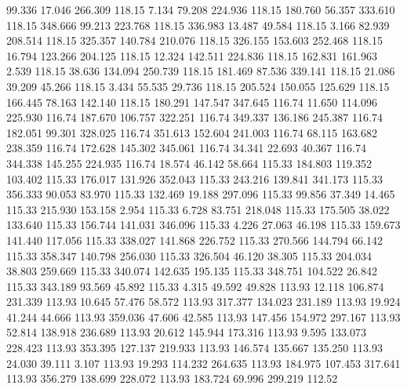   99.336   17.046  266.309       118.15
   7.134   79.208  224.936       118.15
 180.760   56.357  333.610       118.15
 348.666   99.213  223.768       118.15
 336.983   13.487   49.584       118.15
   3.166   82.939  208.514       118.15
 325.357  140.784  210.076       118.15
 326.155  153.603  252.468       118.15
  16.794  123.266  204.125       118.15
  12.324  142.511  224.836       118.15
 162.831  161.963    2.539       118.15
  38.636  134.094  250.739       118.15
 181.469   87.536  339.141       118.15
  21.086   39.209   45.266       118.15
   3.434   55.535   29.736       118.15
 205.524  150.055  125.629       118.15
 166.445   78.163  142.140       118.15
 180.291  147.547  347.645       116.74
  11.650  114.096  225.930       116.74
 187.670  106.757  322.251       116.74
 349.337  136.186  245.387       116.74
 182.051   99.301  328.025       116.74
 351.613  152.604  241.003       116.74
  68.115  163.682  238.359       116.74
 172.628  145.302  345.061       116.74
  34.341   22.693   40.367       116.74
 344.338  145.255  224.935       116.74
  18.574   46.142   58.664       115.33
 184.803  119.352  103.402       115.33
 176.017  131.926  352.043       115.33
 243.216  139.841  341.173       115.33
 356.333   90.053   83.970       115.33
 132.469   19.188  297.096       115.33
  99.856   37.349   14.465       115.33
 215.930  153.158    2.954       115.33
   6.728   83.751  218.048       115.33
 175.505   38.022  133.640       115.33
 156.744  141.031  346.096       115.33
   4.226   27.063   46.198       115.33
 159.673  141.440  117.056       115.33
 338.027  141.868  226.752       115.33
 270.566  144.794   66.142       115.33
 358.347  140.798  256.030       115.33
 326.504   46.120   38.305       115.33
 204.034   38.803  259.669       115.33
 340.074  142.635  195.135       115.33
 348.751  104.522   26.842       115.33
 343.189   93.569   45.892       115.33
   4.315   49.592   49.828       113.93
  12.118  106.874  231.339       113.93
  10.645   57.476   58.572       113.93
 317.377  134.023  231.189       113.93
  19.924   41.244   44.666       113.93
 359.036   47.606   42.585       113.93
 147.456  154.972  297.167       113.93
  52.814  138.918  236.689       113.93
  20.612  145.944  173.316       113.93
   9.595  133.073  228.423       113.93
 353.395  127.137  219.933       113.93
 146.574  135.667  135.250       113.93
  24.030   39.111    3.107       113.93
  19.293  114.232  264.635       113.93
 184.975  107.453  317.641       113.93
 356.279  138.699  228.072       113.93
 183.724   69.996  299.219       112.52
